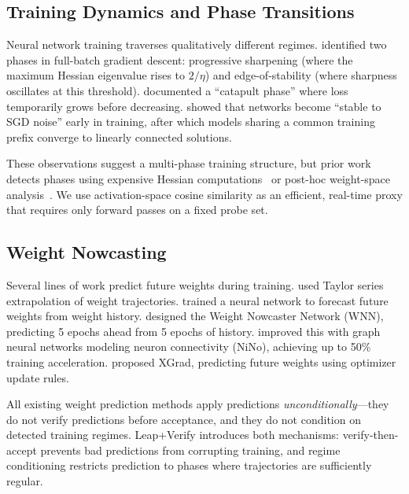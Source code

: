 \documentclass{article}
\begin{document}
\subsection{Training Dynamics and Phase Transitions}

Neural network training traverses qualitatively different regimes.
\citet{cohen2021gradient} identified two phases in full-batch gradient descent: progressive sharpening (where the maximum Hessian eigenvalue rises to $2/\eta$) and edge-of-stability (where sharpness oscillates at this threshold).
\citet{lewkowycz2020large} documented a ``catapult phase'' where loss temporarily grows before decreasing.
\citet{frankle2020linear} showed that networks become ``stable to SGD noise'' early in training, after which models sharing a common training prefix converge to linearly connected solutions.

These observations suggest a multi-phase training structure, but prior work detects phases using expensive Hessian computations~\citep{cohen2021gradient} or post-hoc weight-space analysis~\citep{frankle2020linear}.
We use activation-space cosine similarity as an efficient, real-time proxy that requires only forward passes on a fixed probe set.

\subsection{Weight Nowcasting}

Several lines of work predict future weights during training.
\citet{kamarthi1999accelerating} used Taylor series extrapolation of weight trajectories.
\citet{sinha2017introspection} trained a neural network to forecast future weights from weight history.
\citet{jang2023wnn} designed the Weight Nowcaster Network (WNN), predicting 5 epochs ahead from 5 epochs of history.
\citet{knyazev2025nino} improved this with graph neural networks modeling neuron connectivity (NiNo), achieving up to 50\% training acceleration.
\citet{guan2024xgrad} proposed XGrad, predicting future weights using optimizer update rules.

All existing weight prediction methods apply predictions \emph{unconditionally}---they do not verify predictions before acceptance, and they do not condition on detected training regimes.
Leap+Verify introduces both mechanisms: verify-then-accept prevents bad predictions from corrupting training, and regime conditioning restricts prediction to phases where trajectories are sufficiently regular.
\end{document}
